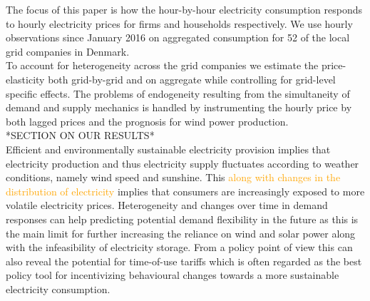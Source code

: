 \label{sec:intro}
The focus of this paper is how the hour-by-hour electricity consumption responds to hourly electricity prices for firms and households respectively. We use hourly observations since January 2016 on aggregated consumption for 52 of the local grid companies in Denmark.
\medskip\\

To account for heterogeneity across the grid companies we estimate the price-elasticity both grid-by-grid and on aggregate while controlling for grid-level specific effects. The problems of endogeneity resulting from the simultaneity of demand and supply mechanics is handled by instrumenting the hourly price by both lagged prices and the prognosis for wind power production.
\medskip\\

*SECTION ON OUR RESULTS*
\medskip\\

Efficient and environmentally sustainable electricity provision implies that electricity production and thus electricity supply fluctuates according to weather conditions, namely wind speed and sunshine. This \textcolor{orange}{along with changes in the distribution of electricity}
implies that consumers are increasingly exposed to more volatile electricity prices. Heterogeneity and changes over time in demand responses can help predicting potential demand flexibility in the future as this is the main limit for further increasing the reliance on wind and solar power along with the infeasibility of electricity storage. From a policy point of view this can also reveal the potential for time-of-use tariffs which is often regarded as the best policy tool for incentivizing behavioural changes towards a more sustainable electricity consumption.
